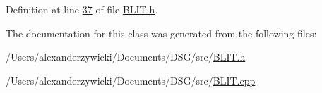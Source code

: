 Definition at line \hyperlink{_b_l_i_t_8h_source_l00037}{37} of file \hyperlink{_b_l_i_t_8h_source}{B\+L\+I\+T.\+h}.



The documentation for this class was generated from the following files\+:\begin{DoxyCompactItemize}
\item 
/\+Users/alexanderzywicki/\+Documents/\+D\+S\+G/src/\hyperlink{_b_l_i_t_8h}{B\+L\+I\+T.\+h}\item 
/\+Users/alexanderzywicki/\+Documents/\+D\+S\+G/src/\hyperlink{_b_l_i_t_8cpp}{B\+L\+I\+T.\+cpp}\end{DoxyCompactItemize}
